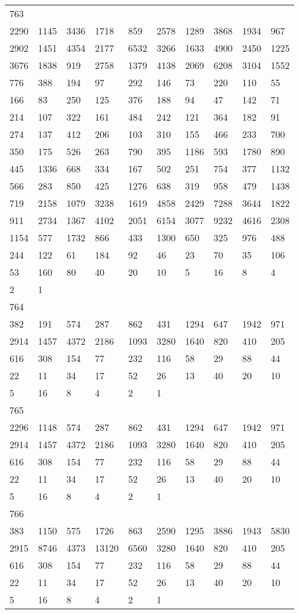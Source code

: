 \begin{longtable}{*{10}{l}}
763&&&&&&&&&\\
2290& 1145& 3436& 1718& 859& 2578& 1289& 3868& 1934& 967\\
2902& 1451& 4354& 2177& 6532& 3266& 1633& 4900& 2450& 1225\\
3676& 1838& 919& 2758& 1379& 4138& 2069& 6208& 3104& 1552\\
776& 388& 194& 97& 292& 146& 73& 220& 110& 55\\
166& 83& 250& 125& 376& 188& 94& 47& 142& 71\\
214& 107& 322& 161& 484& 242& 121& 364& 182& 91\\
274& 137& 412& 206& 103& 310& 155& 466& 233& 700\\
350& 175& 526& 263& 790& 395& 1186& 593& 1780& 890\\
445& 1336& 668& 334& 167& 502& 251& 754& 377& 1132\\
566& 283& 850& 425& 1276& 638& 319& 958& 479& 1438\\
719& 2158& 1079& 3238& 1619& 4858& 2429& 7288& 3644& 1822\\
911& 2734& 1367& 4102& 2051& 6154& 3077& 9232& 4616& 2308\\
1154& 577& 1732& 866& 433& 1300& 650& 325& 976& 488\\
244& 122& 61& 184& 92& 46& 23& 70& 35& 106\\
53& 160& 80& 40& 20& 10& 5& 16& 8& 4\\
2& 1& \\

764&&&&&&&&&\\
382& 191& 574& 287& 862& 431& 1294& 647& 1942& 971\\
2914& 1457& 4372& 2186& 1093& 3280& 1640& 820& 410& 205\\
616& 308& 154& 77& 232& 116& 58& 29& 88& 44\\
22& 11& 34& 17& 52& 26& 13& 40& 20& 10\\
5& 16& 8& 4& 2& 1& \\

765&&&&&&&&&\\
2296& 1148& 574& 287& 862& 431& 1294& 647& 1942& 971\\
2914& 1457& 4372& 2186& 1093& 3280& 1640& 820& 410& 205\\
616& 308& 154& 77& 232& 116& 58& 29& 88& 44\\
22& 11& 34& 17& 52& 26& 13& 40& 20& 10\\
5& 16& 8& 4& 2& 1& \\

766&&&&&&&&&\\
383& 1150& 575& 1726& 863& 2590& 1295& 3886& 1943& 5830\\
2915& 8746& 4373& 13120& 6560& 3280& 1640& 820& 410& 205\\
616& 308& 154& 77& 232& 116& 58& 29& 88& 44\\
22& 11& 34& 17& 52& 26& 13& 40& 20& 10\\
5& 16& 8& 4& 2& 1& \\


\end{longtable}
